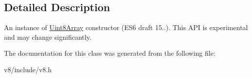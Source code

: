 \subsection{Detailed Description}
An instance of \hyperlink{classv8_1_1Uint8Array}{Uint8\+Array} constructor (E\+S6 draft 15..). This A\+P\+I is experimental and may change significantly. 

The documentation for this class was generated from the following file\+:\begin{DoxyCompactItemize}
\item 
v8/include/v8.\+h\end{DoxyCompactItemize}
